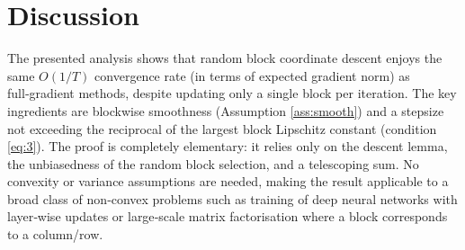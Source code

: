\documentclass{article}
\begin{document}
\section*{Discussion}
The presented analysis shows that random block coordinate descent enjoys the same $O(1/T)$ convergence rate (in terms of expected gradient norm) as full‑gradient methods, despite updating only a single block per iteration. The key ingredients are blockwise smoothness (Assumption \ref{ass:smooth}) and a stepsize not exceeding the reciprocal of the largest block Lipschitz constant (condition \eqref{eq:3}). The proof is completely elementary: it relies only on the descent lemma, the unbiasedness of the random block selection, and a telescoping sum. No convexity or variance assumptions are needed, making the result applicable to a broad class of non‑convex problems such as training of deep neural networks with layer‑wise updates or large‑scale matrix factorisation where a block corresponds to a column/row.
\end{document}
